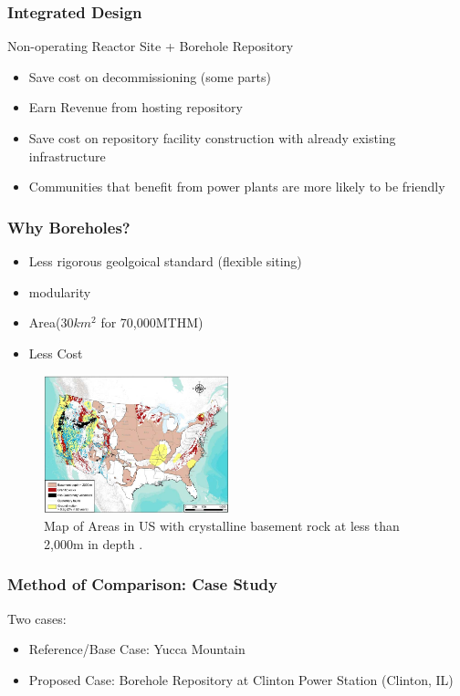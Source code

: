 \begin{frame}
	\frametitle{Integrated Design}
	Non-operating Reactor Site + Borehole Repository
	\begin{itemize}
		\item Save cost on decommissioning (some parts)
		\item Earn Revenue from hosting repository
		\item Save cost on repository facility construction
			  with already existing infrastructure
		\item Communities that benefit from power plants are more likely
			  to be friendly
	\end{itemize}
\end{frame}

\begin{frame}
	\frametitle{Why Boreholes?}
	\begin{itemize}
		\item Less rigorous geolgoical standard (flexible siting)
		\item modularity
		\item Area(30$km^2$ for 70,000MTHM)
		\item Less Cost
	\end{itemize}
	\begin{figure}[htbp!]
		\begin{center}
			\includegraphics[height=4cm]{./images/cbrock.png}
		\end{center}
		\caption{Map of Areas in US with crystalline basement rock at less than 2,000m in depth
			 \cite{freeze_siting_2015}.}
		\label{fig:basement_map}
	\end{figure}
\end{frame}

\begin{frame}
	\frametitle{Method of Comparison: Case Study}
	Two cases:
	\begin{itemize}
		\item Reference/Base Case: Yucca Mountain
		\item Proposed Case: Borehole Repository at Clinton Power Station (Clinton, IL)
	\end{itemize}
\end{frame}

